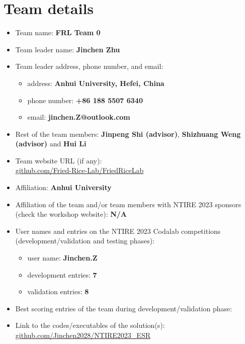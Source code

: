 \documentclass[10pt,twocolumn,letterpaper]{article}
\begin{document}
\section{Team details}

\newcommand{\github}[1]{\href{https://github.com/#1/}{github.com/#1}}

\begin{itemize}
	\item Team name: \textbf{FRL Team 0}                                  
	\item Team leader name: \textbf{Jinchen Zhu}                          
	\item Team leader address, phone number, and email:
	\begin{itemize}
		\item address: \textbf{Anhui University, Hefei, China}
		\item phone number: \textbf{+86 188 5507 6340}
		\item email: \textbf{jinchen.Z@outlook.com}
	\end{itemize}
	\item Rest of the team members: \textbf{Jinpeng Shi (advisor)}, \textbf{Shizhuang Weng (advisor)} and  \textbf{Hui Li}
	\item Team website URL (if any): \\ \github{Fried-Rice-Lab/FriedRiceLab}                   
	\item Affiliation: \textbf{Anhui University}
	\item Affiliation of the team and/or team members with NTIRE 2023 sponsors (check the workshop website): \textbf{N/A}
	\item User names and entries on the NTIRE 2023 Codalab competitions (development/validation and testing phases):
	\begin{itemize}
		\item user name: \textbf{Jinchen.Z}
		\item development entries: \textbf{7}
		\item validation entries: \textbf{8}
	\end{itemize}
	\item Best scoring entries of the team during development/validation phase:
	\begin{table}[h]
		\centering
	\end{table}
	\item Link to the codes/executables of the solution(s): \\ \github{Jinchen2028/NTIRE2023\_ESR}
\end{itemize}
\end{document}
